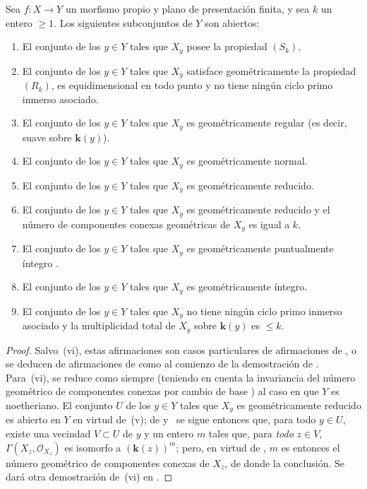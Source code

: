 \begin{theorem}[12.2.4]
\label{IV.12.2.4}
Sea $f:X\to Y$ un morfismo propio y plano de presentación finita, y sea $k$ un entero $\geq 1$.
Los siguientes subconjuntos de $Y$ son abiertos:
\begin{enumerate}[label=\textup{(\roman*)}]
  \item El conjunto de los $y\in Y$ tales que $X_y$ posee la propiedad $(S_k)$.
  \item El conjunto de los $y\in Y$ tales que $X_y$ satisface geométricamente la propiedad $(R_k)$, es equidimensional en todo punto y no tiene ningún ciclo primo inmerso asociado.
  \item El conjunto de los $y\in Y$ tales que $X_y$ es geométricamente regular \textup{(es decir,} suave sobre $\boldsymbol{k}(y)$\textup{)}.
  \item El conjunto de los $y\in Y$ tales que $X_y$ es geométricamente normal.
  \item El conjunto de los $y\in Y$ tales que $X_y$ es geométricamente reducido.
  \item El conjunto de los $y\in Y$ tales que $X_y$ es geométricamente reducido y el número de componentes conexas geométricas de $X_y$ es igual a $k$.
  \item El conjunto de los $y\in Y$ tales que $X_y$ es geométricamente puntualmente íntegro .
  \item El conjunto de los $y\in Y$ tales que $X_y$ es geométricamente íntegro.
  \item El conjunto de los $y\in Y$ tales que $X_y$ no tiene ningún ciclo primo inmerso asociado y la multiplicidad total  de $X_y$ sobre $\boldsymbol{k}(y)$ es $\leq k$.
\end{enumerate}
\end{theorem}

\begin{proof}
Salvo~(vi), estas afirmaciones son casos particulares de afirmaciones de , o se deducen de afirmaciones de  como al comienzo de la demostración de .
Para~(vi), se reduce como siempre (teniendo en cuenta la invariancia del número geométrico de componentes conexas por cambio de base ) al caso en que $Y$ es noetheriano.
El conjunto $U$ de los $y\in Y$ tales que $X_y$ es geométricamente reducido es abierto en $Y$ en virtud de~(v); de  y~ se sigue entonces que, para todo $y\in U$, existe una vecindad $V\subset U$ de $y$ y un entero $m$ tales que, para \emph{todo} $z\in V$, $\Gamma(X_z,\mathcal O_{X_z})$ es isomorfo a $(\boldsymbol{k}(z))^m$; pero, en virtud de , $m$ es entonces el número geométrico de componentes conexas de $X_z$, de donde la conclusión.
Se dará otra demostración de~(vi) en .
\end{proof}


